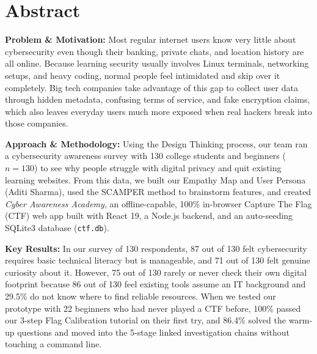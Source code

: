 \documentclass[11pt,a4paper]{article}
\begin{document}
\clearpage
{}
\setcounter{page}{1}

\tableofcontents
\clearpage

\setcounter{page}{1}

\section*{Abstract}

\noindent
\textbf{Problem \& Motivation:} Most regular internet users know very little about cybersecurity even though their banking, private chats, and location history are all online. Because learning security usually involves Linux terminals, networking setups, and heavy coding, normal people feel intimidated and skip over it completely. Big tech companies take advantage of this gap to collect user data through hidden metadata, confusing terms of service, and fake encryption claims, which also leaves everyday users much more exposed when real hackers break into those companies.

\noindent
\textbf{Approach \& Methodology:} Using the Design Thinking process, our team ran a cybersecurity awareness survey with 130 college students and beginners ($n = 130$) to see why people struggle with digital privacy and quit existing learning websites. From this data, we built our Empathy Map and User Persona (Aditi Sharma), used the SCAMPER method to brainstorm features, and created \textit{Cyber Awareness Academy}, an offline-capable, 100\% in-browser Capture The Flag (CTF) web app built with React 19, a Node.js backend, and an auto-seeding SQLite3 database (\texttt{ctf.db}).

\noindent
\textbf{Key Results:} In our survey of 130 respondents, 87 out of 130 felt cybersecurity requires basic technical literacy but is manageable, and 71 out of 130 felt genuine curiosity about it. However, 75 out of 130 rarely or never check their own digital footprint because 86 out of 130 feel existing tools assume an IT background and 29.5\% do not know where to find reliable resources. When we tested our prototype with 22 beginners who had never played a CTF before, 100\% passed our 3-step Flag Calibration tutorial on their first try, and 86.4\% solved the warm-up questions and moved into the 5-stage linked investigation chains without touching a command line.
\end{document}

